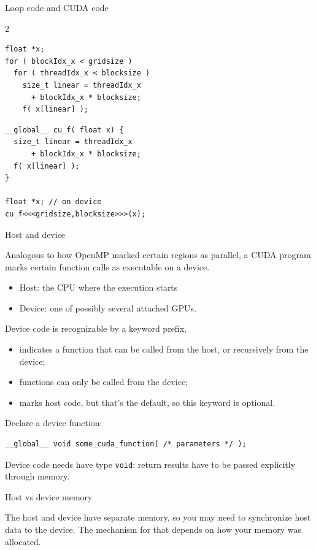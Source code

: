 \begin{block}{Loop code and CUDA code}
  \label{sl:cuda-loop}
\begin{multicols}{2}
\begin{lstlisting}
float *x;
for ( blockIdx_x < gridsize )
  for ( threadIdx_x < blocksize )
    size_t linear = threadIdx_x
      + blockIdx_x * blocksize;
    f( x[linear] );
\end{lstlisting}
\columnbreak
\begin{lstlisting}
__global__ cu_f( float x) {
  size_t linear = threadIdx_x
      + blockIdx_x * blocksize;
  f( x[linear] );
}  

float *x; // on device
cu_f<<<gridsize,blocksize>>>(x);
\end{lstlisting}
\end{multicols}
\end{block}

 {Host and device}

Analogous to how OpenMP marked certain regions as parallel,
a \ac{CUDA} program marks certain function calls as
executable on a device.
\begin{itemize}
\item Host: the CPU where the execution starts
\item Device: one of possibly several attached \acp{GPU}.
\end{itemize}
Device code is recognizable by a keyword prefix,
\begin{itemize}
\item
   indicates a function that can be called from the host,
  or recursively from the device;
\item  {} functions can only be called from the device;
\item {} marks host code, but that's the default,
  so this keyword is optional.
\end{itemize}

Declare a device function:
\begin{lstlisting}
__global__ void some_cuda_function( /* parameters */ );
\end{lstlisting}
Device code needs have type \lstinline{void}:
return results have to be passed explicitly through memory.

 {Host vs device memory}

The host and device have separate memory, so you may need to
synchronize host data to the device.
The mechanism for that depends on how your memory was allocated.


